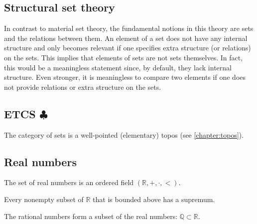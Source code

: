 \subsection{Structural set theory}

    In contrast to material set theory, the fundamental notions in this theory are sets and the relations between them. An element of a set does not have any internal structure and only becomes relevant if one specifies extra structure (or relations) on the sets. This implies that elements of sets are not sets themselves. In fact, this would be a meaningless statement since, by default, they lack internal structure. Even stronger, it is meaningless to compare two elements if one does not provide relations or extra structure on the sets.


\subsection{\texorpdfstring{ETCS $\clubsuit$}{ETCS}}



    \begin{axiom}
        The category of sets is a well-pointed (elementary) topos (see \cref{chapter:topos}).
    \end{axiom}

\subsection{Real numbers}

    \begin{axiom}[Ordering]
        The set of real numbers is an ordered field $(\mathbb{R},+,\cdot,<)$.
    \end{axiom}
    \begin{axiom}
        Every nonempty subset of $\mathbb{R}$ that is bounded above has a supremum.
    \end{axiom}

    \begin{axiom}
        The rational numbers form a subset of the real numbers: $\mathbb{Q}\subset\mathbb{R}$.
    \end{axiom}

